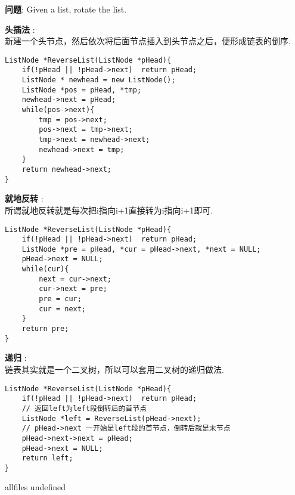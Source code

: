 \documentclass{article}
\begin{document}
\begin{CJK}{UTF8}{gbsn}     %

\else
    
\begin{description}
    \item{\textbf{问题}}: Given a list, rotate the list.
    \item{\textbf{头插法}} : 
    \\新建一个头节点，然后依次将后面节点插入到头节点之后，便形成链表的倒序.
    \begin{lstlisting}
ListNode *ReverseList(ListNode *pHead){
	if(!pHead || !pHead->next)	return pHead;
	ListNode * newhead = new ListNode();
	ListNode *pos = pHead, *tmp;
	newhead->next = pHead;
	while(pos->next){
		tmp = pos->next;
		pos->next = tmp->next;
		tmp->next = newhead->next;
		newhead->next = tmp;
	}
	return newhead->next;
}
    \end{lstlisting}
    \item{\textbf{就地反转}} : 
	\\所谓就地反转就是每次把i指向i+1直接转为i指向i+1即可.
	\begin{lstlisting}
ListNode *ReverseList(ListNode *pHead){
	if(!pHead || !pHead->next)	return pHead;
	ListNode *pre = pHead, *cur = pHead->next, *next = NULL;
	pHead->next = NULL;
	while(cur){
		next = cur->next;
		cur->next = pre;
		pre = cur;
		cur = next;
	}
	return pre;
}
	\end{lstlisting}
    \item{\textbf{递归}} : 
	\\链表其实就是一个二叉树，所以可以套用二叉树的递归做法.
	\begin{lstlisting}
ListNode *ReverseList(ListNode *pHead){
	if(!pHead || !pHead->next)	return pHead;
	// 返回left为left段倒转后的首节点
	ListNode *left = ReverseList(pHead->next); 
	// pHead->next 一开始是left段的首节点，倒转后就是末节点
	pHead->next->next = pHead; 
	pHead->next = NULL;
	return left;
}
	\end{lstlisting}
\end{description}

\fi

\ifx allfiles undefined
\end{CJK}
\end{document}
